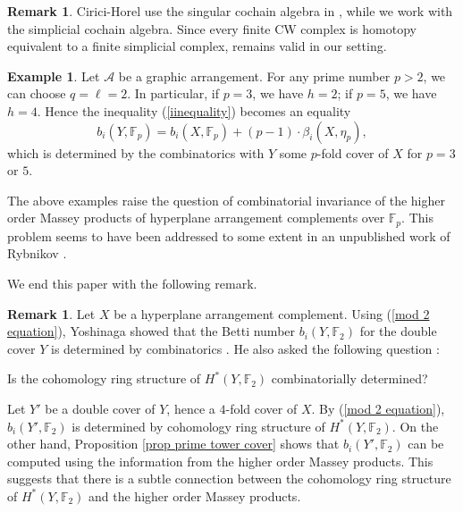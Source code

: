 \documentclass[12pt,leqno,twoside]{amsart}
\theoremstyle{plain}
\theoremstyle{definition}
\newtheorem{rmk}[theorem]{Remark}
\newtheorem{ex}[theorem]{Example}
\def\br{\begin{rmk}}
\def\er{\end{rmk}}
\def\bex{\begin{ex}}
\def\eex{\end{ex}}
\newcommand{\F}{\mathbb{F}}
\newcommand{\sA}{\mathcal{A}}
\begin{document}
\br Cirici-Horel use the singular cochain algebra in \cite{CH22}, while we work with the simplicial cochain algebra.   Since every finite CW complex is homotopy equivalent to a finite simplicial complex, \cite[Theorem 7.12]{CH22,CH24} remains valid in our setting. 
\er 

\bex \label{ex graphic}
Let $\sA$ be a graphic arrangement. For any prime number $p>2$, we can choose $q=\ell=2 $. 
In particular, if $p=3$, we have $h=2$; if $p=5$, we have  $h=4$.
Hence the inequality (\ref{iinequality}) becomes an equality
$$b_i(Y,\F_p)=b_i(X,\F_p) + (p-1)\cdot \beta_i(X,\eta_p),$$
which is determined by the combinatorics with $Y$ some $p$-fold cover of $X$ for $p=3$ or $5$.
\eex 


The above examples raise the question of combinatorial invariance of the higher order Massey products of hyperplane arrangement complements over $\F_p$. This problem seems to have been addressed to some extent in an unpublished work of Rybnikov \cite{Ry}.


\medskip

We end this paper with the following remark.
\begin{rmk} 
Let $X$  be a hyperplane arrangement complement. Using (\ref{mod 2 equation}), 
Yoshinaga showed that the Betti number $b_i(Y,\F_2)$ for the double cover $Y$ is determined by combinatorics  \cite{Yos}.
He also asked the following question \cite[Remark 3.8]{Yos}: 
\begin{center}
    Is the cohomology ring structure of $H^*(Y,\F_2)$ combinatorially determined?
\end{center}

Let $Y'$ be a double cover of $Y$, hence a $4$-fold cover of $X$. By (\ref{mod 2 equation}), $b_i(Y',\F_2)$ is determined by cohomology ring structure of $H^*(Y,\F_2)$. On the other hand, Proposition \ref{prop prime tower cover} shows that $b_i(Y',\F_2)$ can be computed using the information from the higher order Massey products. 
This suggests that there is a  subtle connection between the cohomology ring structure of $H^*(Y,\F_2)$ and the higher order Massey products. 
\end{rmk}




\end{document}
